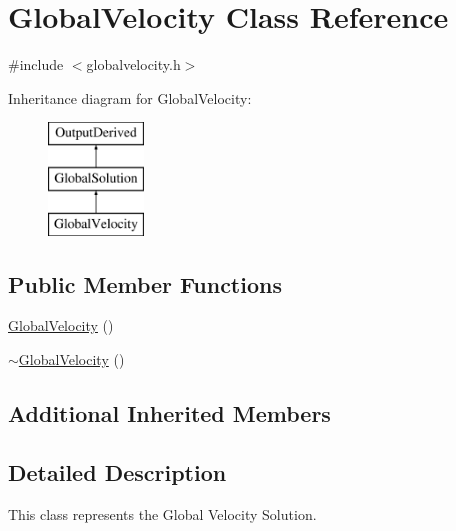 \hypertarget{class_global_velocity}{\section{Global\-Velocity Class Reference}
\label{class_global_velocity}
}


{\ttfamily \#include $<$globalvelocity.\-h$>$}

Inheritance diagram for Global\-Velocity\-:\begin{figure}[H]
\begin{center}
\leavevmode
\includegraphics[height=3.000000cm]{class_global_velocity}
\end{center}
\end{figure}
\subsection*{Public Member Functions}
\begin{DoxyCompactItemize}
\item 
\hyperlink{class_global_velocity_a444ab39b351acd4e6ca7dc8088e2a9b8}{Global\-Velocity} ()
\item 
\hyperlink{class_global_velocity_a2b8f719180b1786a582d90603db8f2d8}{$\sim$\-Global\-Velocity} ()
\end{DoxyCompactItemize}
\subsection*{Additional Inherited Members}


\subsection{Detailed Description}
This class represents the Global Velocity Solution. 


